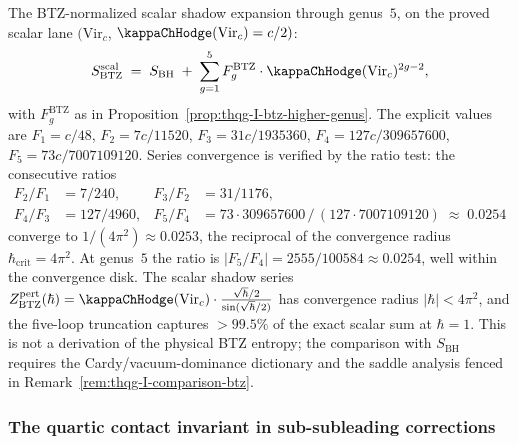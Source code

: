 \begin{computation}
\label{comp:btz-five-loop}%
%
The BTZ-normalized scalar shadow expansion through genus~$5$, on the
proved scalar lane
$(\mathrm{Vir}_c$, $\kappaChHodge(\mathrm{Vir}_c)=c/2)$:
\begin{equation}\label{eq:btz-five-loop}
S_{\mathrm{BTZ}}^{\mathrm{scal}}
\;=\;
S_{\mathrm{BH}}
\;+\;
\sum_{g=1}^{5} F_g^{\mathrm{BTZ}} \cdot
\kappaChHodge(\mathrm{Vir}_c)^{2g-2},
\end{equation}
with $F_g^{\mathrm{BTZ}}$ as in
Proposition~\textup{\ref{prop:thqg-I-btz-higher-genus}}.
The explicit values are $F_1 = c/48$,
$F_2 = 7c/11520$,
$F_3 = 31c/1935360$,
$F_4 = 127c/309657600$,
$F_5 = 73c/7007109120$.
Series convergence is verified by the ratio test:
the consecutive ratios
\begin{align*}
F_2/F_1 &= 7/240, &
F_3/F_2 &= 31/1176, \\
F_4/F_3 &= 127/4960, &
F_5/F_4 &= 73 \cdot 309657600\,/\,(127 \cdot 7007109120)
\;\approx\; 0.0254
\end{align*}
converge to $1/(4\pi^2) \approx 0.0253$, the reciprocal of
the convergence radius $\hbar_{\mathrm{crit}} = 4\pi^2$.
At genus~$5$ the ratio is $|F_5/F_4| = 2555/100584
\approx 0.0254$, well within the convergence disk.
The scalar shadow series
$Z_{\mathrm{BTZ}}^{\mathrm{pert}}(\hbar)
= \kappaChHodge(\mathrm{Vir}_c) \cdot
\frac{\sqrt{\hbar}/2}{\sin(\sqrt{\hbar}/2)}$
has convergence radius $|\hbar| < 4\pi^2$, and the five-loop
truncation captures $>99.5\%$ of the exact scalar sum at
$\hbar = 1$.
This is not a derivation of the physical BTZ entropy; the comparison
with $S_{\mathrm{BH}}$ requires the Cardy/vacuum-dominance dictionary
and the saddle analysis fenced in Remark~\ref{rem:thqg-I-comparison-btz}.
\end{computation}

\subsubsection{The quartic contact invariant in sub-subleading corrections}

